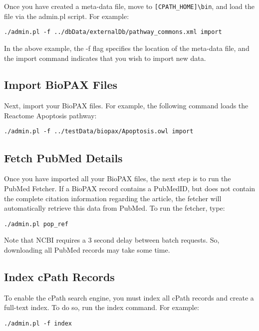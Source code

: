 \documentclass[letterpaper,12pt]{article}
\begin{document}
Once you have created a meta-data file, move to \verb+[CPATH_HOME]\bin+, and load the file via the admin.pl script.  For example:

\begin{verbatim}
./admin.pl -f ../dbData/externalDb/pathway_commons.xml import
\end{verbatim}

In the above example, the -f flag specifies the location of the meta-data file, and the import command indicates that you wish to import new data.

\subsection{Import BioPAX Files}

Next, import your BioPAX files.  For example, the following command loads the Reactome Apoptosis pathway:

\begin{verbatim}
./admin.pl -f ../testData/biopax/Apoptosis.owl import
\end{verbatim}


\subsection{Fetch PubMed Details}

Once you have imported all your BioPAX files, the next step is to run the PubMed Fetcher.  If a BioPAX record contains a PubMedID, but does not contain the complete citation information regarding the article, the fetcher will automatically retrieve this data from PubMed.  To run the fetcher, type:

\begin{verbatim}
./admin.pl pop_ref
\end{verbatim}

Note that NCBI requires a 3 second delay between batch requests.  So, downloading all PubMed records may take some time.

\subsection{Index cPath Records}

To enable the cPath search engine, you must index all cPath records and create a full-text index.  To do so, run the index command.  For example:

\begin{verbatim}
./admin.pl -f index
\end{verbatim}
\end{document}
